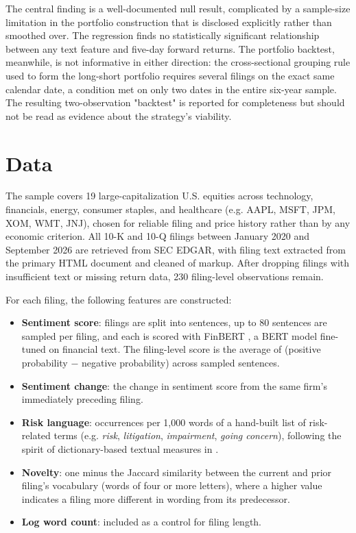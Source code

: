 \documentclass[11pt]{article}
\begin{document}
The central finding is a well-documented null result, complicated by a sample-size limitation in the portfolio construction that is disclosed explicitly rather than smoothed over. The regression finds no statistically significant relationship between any text feature and five-day forward returns. The portfolio backtest, meanwhile, is not informative in either direction: the cross-sectional grouping rule used to form the long-short portfolio requires several filings on the exact same calendar date, a condition met on only two dates in the entire six-year sample. The resulting two-observation "backtest" is reported for completeness but should not be read as evidence about the strategy's viability.

\section{Data}

The sample covers 19 large-capitalization U.S. equities across technology, financials, energy, consumer staples, and healthcare (e.g. AAPL, MSFT, JPM, XOM, WMT, JNJ), chosen for reliable filing and price history rather than by any economic criterion. All 10-K and 10-Q filings between January 2020 and September 2026 are retrieved from SEC EDGAR, with filing text extracted from the primary HTML document and cleaned of markup. After dropping filings with insufficient text or missing return data, 230 filing-level observations remain.

For each filing, the following features are constructed:
\begin{itemize}
\item \textbf{Sentiment score}: filings are split into sentences, up to 80 sentences are sampled per filing, and each is scored with FinBERT \citep{araci2019}, a BERT model fine-tuned on financial text. The filing-level score is the average of (positive probability $-$ negative probability) across sampled sentences.
\item \textbf{Sentiment change}: the change in sentiment score from the same firm's immediately preceding filing.
\item \textbf{Risk language}: occurrences per 1,000 words of a hand-built list of risk-related terms (e.g. \textit{risk}, \textit{litigation}, \textit{impairment}, \textit{going concern}), following the spirit of dictionary-based textual measures in \citet{loughranmcdonald2011}.
\item \textbf{Novelty}: one minus the Jaccard similarity between the current and prior filing's vocabulary (words of four or more letters), where a higher value indicates a filing more different in wording from its predecessor.
\item \textbf{Log word count}: included as a control for filing length.
\end{itemize}
\end{document}
